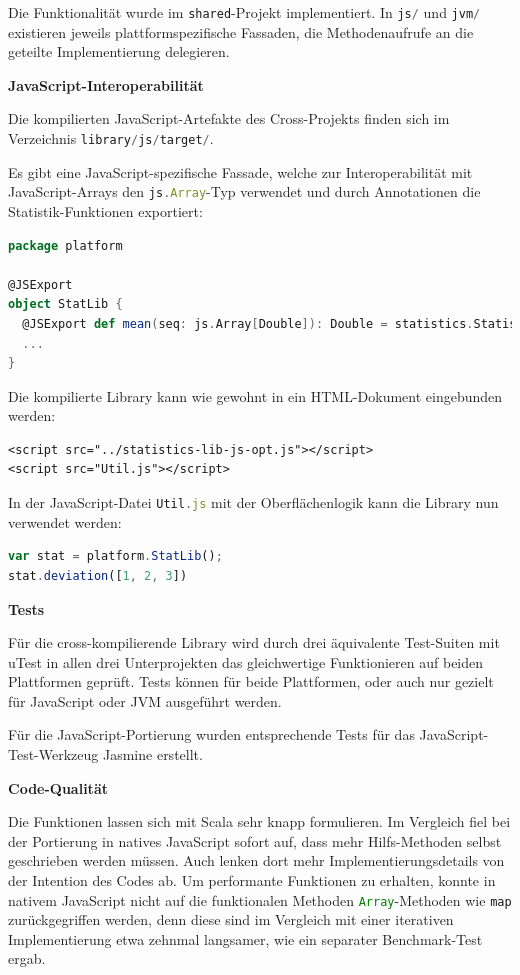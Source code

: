 \documentclass[a4paper, 12pt, hidelinks, listof=totoc, listoftables=totoc, bibliography=totoc]{scrreprt}
\newcommand{\code}[1]{\lstinline[language=Scala, style=inline]|#1|}
\newcommand{\js}[1]{\lstinline[language=JavaScript, style=inline]|#1|}
\newcommand{\MyMiniSec}[1]{\rmfamily\fontsize{12}{15}\selectfont
	\vspace{7pt}\textbf{#1} %
}
\begin{document}
Die Funktionalität wurde im \code{shared}-Projekt implementiert. In \code{js/} und \code{jvm/} existieren jeweils plattformspezifische Fassaden, die Methodenaufrufe an die geteilte Implementierung delegieren.


\MyMiniSec{JavaScript-Interoperabilität}

Die kompilierten JavaScript-Artefakte des Cross-Projekts finden sich im Verzeichnis \linebreak\mbox{\code{library/js/target/}}.

Es gibt eine JavaScript-spezifische Fassade, welche zur Interoperabilität mit JavaScript-Arrays den \js{js.Array}-Typ verwendet und durch Annotationen die Statistik-Funktionen exportiert:

\begin{lstlisting}[language=Scala, style=snippet]
package platform

@JSExport
object StatLib {
  @JSExport def mean(seq: js.Array[Double]): Double = statistics.Statistics.mean(seq)
  ...
}
\end{lstlisting}

Die kompilierte Library kann wie gewohnt in ein \ac{HTML}-Dokument eingebunden werden:

\begin{lstlisting}[language=HTML5, style=snippet]
<script src="../statistics-lib-js-opt.js"></script>
<script src="Util.js"></script>
\end{lstlisting}

In der JavaScript-Datei \js{Util.js} mit der Oberflächenlogik kann die Library nun verwendet werden:

\begin{lstlisting}[language=JavaScript, style=snippet]
var stat = platform.StatLib();
stat.deviation([1, 2, 3])
\end{lstlisting}


\MyMiniSec{Tests}

Für die cross-kompilierende Library wird durch drei äquivalente Test-Suiten mit uTest in allen drei Unterprojekten das gleichwertige Funktionieren auf beiden Plattformen geprüft. Tests können für beide Plattformen, oder auch nur gezielt für JavaScript oder \ac{JVM} ausgeführt werden.

Für die JavaScript-Portierung wurden entsprechende 
Tests für das JavaScript-Test-Werkzeug Jasmine erstellt.


\MyMiniSec{Code-Qualität}

Die Funktionen lassen sich mit Scala sehr knapp formulieren. Im Vergleich fiel bei der Portierung in natives JavaScript sofort auf, dass mehr Hilfs-Methoden selbst geschrieben werden müssen. Auch lenken dort mehr Implementierungsdetails von der Intention des Codes ab. Um performante Funktionen zu erhalten, konnte in nativem JavaScript nicht auf die funktionalen Methoden \js{Array}-Methoden wie \js{map} zurückgegriffen werden, denn diese sind im Vergleich mit einer iterativen Implementierung etwa zehnmal langsamer, wie ein separater Benchmark-Test ergab.
\end{document}
